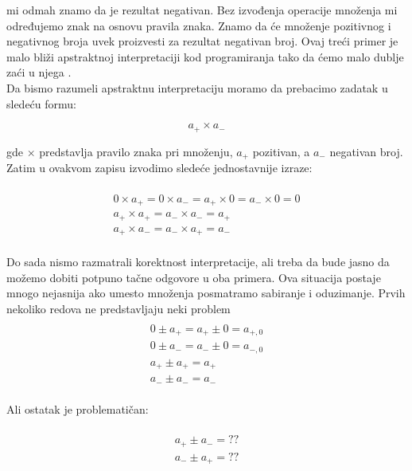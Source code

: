 mi odmah znamo da je rezultat negativan. Bez izvođenja operacije množenja mi određujemo znak na osnovu pravila znaka. Znamo da će množenje pozitivnog i negativnog broja uvek proizvesti za rezultat negativan broj. Ovaj treći primer je malo bliži apstraktnoj interpretaciji kod programiranja tako da ćemo malo dublje zaći u njega \cite{AbramskyHankin}. \\

Da bismo razumeli apstraktnu interpretaciju moramo da prebacimo zadatak u sledeću formu:

\begin{equation}
  a_{+} \times a_{-}
\end{equation}

gde $\times$ predstavlja pravilo znaka pri množenju, $a_{+}$ pozitivan, a $a_{-}$ negativan broj. Zatim u ovakvom zapisu izvodimo sledeće jednostavnije izraze:

\begin{multline} \\
  	0 \times a_{+} = 0 \times a_{-} = a_{+} \times 0 = a_{-} \times 0 = 0 \\
  	a_{+} \times a_{+} = a_{-} \times a_{-} = a_{+} \\
  	a_{+} \times a_{-} = a_{-} \times a_{+} = a_{-} \\
\end{multline}

Do sada nismo razmatrali korektnost interpretacije, ali treba da bude jasno da možemo dobiti potpuno tačne odgovore u oba primera. Ova situacija postaje mnogo nejasnija ako umesto množenja posmatramo sabiranje i oduzimanje. Prvih nekoliko redova ne pred\-stavljaju neki problem \\

\begin{multline} \\
	0 \pm a_{+} = a_{+} \pm 0 = a_{+,0} \\ 
	0 \pm a_{-} = a_{-} \pm 0 = a_{-,0} \\ 
	a_{+} \pm a_{+} = a_{+}  \\ 
	a_{-} \pm a_{-} = a_{-}  \\ 
\end{multline}


Ali ostatak je problematičan:

\begin{multline}	\\
	a_{+} \pm a_{-} = ?? \\ 
	a_{-} \pm a_{+} = ?? \\ 
\end{multline}

